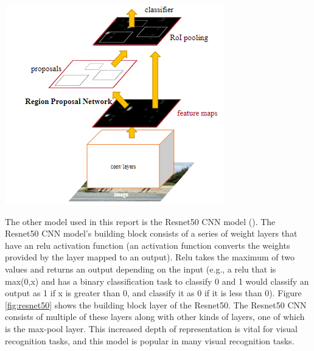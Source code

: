 \documentclass[man]{apa7}
\begin{document}
\begin{minipage}{\linewidth}
  \includegraphics[height=\textheight/4 ,width=\textwidth/2]{figures/fasterRCNN2.png}
  \label{fig:fasterRCNNArchitecture}
\end{minipage}

The other model used in this report is the Resnet50 CNN model (\textcite{resnet50}). The Resnet50 CNN model's building block consists of a series of weight layers that have an relu activation function (an activation function converts the weights provided by the layer mapped to an output). Relu takes the maximum of two values and returns an output depending on the input (e.g., a relu that is max(0,x) and has a binary classification task to classify 0 and 1 would classify an output as 1 if x is greater than 0, and classify it as 0 if it is less than 0). Figure \ref{fig:resnet50} shows the building block layer of the Resnet50. The Resnet50 CNN consists of multiple of these layers along with other kinds of layers, one of which is the max-pool layer. This increased depth of representation is vital for visual recognition tasks, and this model is popular in many visual recognition tasks.
\end{document}
